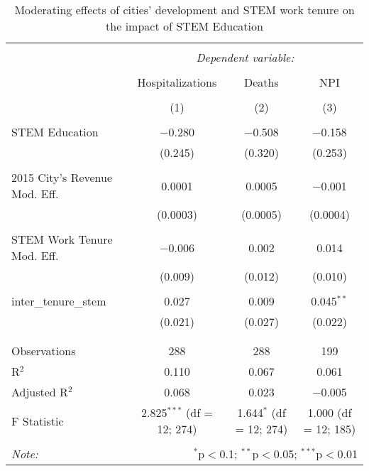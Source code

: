 
\begin{table}[!htbp] \centering 
  \caption{Moderating effects of cities’ development and STEM work tenure on the impact of STEM Education} 
  \label{} 
\begin{tabular}{@{\extracolsep{5pt}}lccc} 
\\[-1.8ex]\hline 
\hline \\[-1.8ex] 
 & \multicolumn{3}{c}{\textit{Dependent variable:}} \\ 
\cline{2-4} 
\\[-1.8ex] & Hospitalizations & Deaths & NPI \\ 
\\[-1.8ex] & (1) & (2) & (3)\\ 
\hline \\[-1.8ex] 
 STEM Education & $-$0.280 & $-$0.508 & $-$0.158 \\ 
  & (0.245) & (0.320) & (0.253) \\ 
  & & & \\ 
 2015 City's Revenue Mod. Eff. & 0.0001 & 0.0005 & $-$0.001 \\ 
  & (0.0003) & (0.0005) & (0.0004) \\ 
  & & & \\ 
 STEM Work Tenure Mod. Eff. & $-$0.006 & 0.002 & 0.014 \\ 
  & (0.009) & (0.012) & (0.010) \\ 
  & & & \\ 
 inter\_tenure\_stem & 0.027 & 0.009 & 0.045$^{**}$ \\ 
  & (0.021) & (0.027) & (0.022) \\ 
  & & & \\ 
\hline \\[-1.8ex] 
Observations & 288 & 288 & 199 \\ 
R$^{2}$ & 0.110 & 0.067 & 0.061 \\ 
Adjusted R$^{2}$ & 0.068 & 0.023 & $-$0.005 \\ 
F Statistic & 2.825$^{***}$ (df = 12; 274) & 1.644$^{*}$ (df = 12; 274) & 1.000 (df = 12; 185) \\ 
\hline 
\hline \\[-1.8ex] 
\textit{Note:}  & \multicolumn{3}{r}{$^{*}$p$<$0.1; $^{**}$p$<$0.05; $^{***}$p$<$0.01} \\ 
\end{tabular} 
\end{table} 
